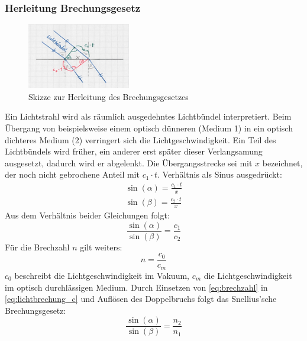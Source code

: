 \documentclass[a4paper, 11pt, ngerman, parskip=half-]{scrartcl}
\begin{document}
\subsubsection*{Herleitung Brechungsgesetz}
%
\begin{figure}[H]
    \centering
    \begin{samepage}
        \includegraphics[width=0.4\textwidth]{image/15/brechungsgesetz.jpg}
        \caption{Skizze zur Herleitung des Brechungsgesetzes}
        \label{fig:brechungsgesetz}
    \end{samepage}
\end{figure}
%
Ein Lichtstrahl wird als räumlich ausgedehntes Lichtbündel interpretiert. Beim Übergang von beispielsweise einem optisch dünneren (Medium 1) in ein optisch dichteres Medium (2) verringert sich die Lichtgeschwindigkeit. Ein Teil des Lichtbündels wird früher, ein anderer erst später dieser Verlangsamung ausgesetzt, dadurch wird er abgelenkt. Die Übergangsstrecke sei mit $x$ bezeichnet, der noch nicht gebrochene Anteil mit $c_1 \cdot t$. Verhältnis als Sinus ausgedrückt:
%
\begin{equation}
    \begin{split}
        \sin(\alpha) = \frac{c_1 \cdot t}{x} \\
        \sin(\beta) = \frac{c_2 \cdot t}{x}
    \end{split}
\end{equation}
%
Aus dem Verhältnis beider Gleichungen folgt:
\begin{equation}
    \label{eq:lichtbrechung_c}
    \frac{\sin(\alpha)}{\sin(\beta)} = \frac{c_1}{c_2}
\end{equation}
%
Für die Brechzahl $n$ gilt weiters:
\begin{equation}
    \label{eq:brechzahl}
    n = \frac{c_0}{c_m}
\end{equation}
%
$c_0$ beschreibt die Lichtgeschwindigkeit im Vakuum, $c_m$ die Lichtgeschwindigkeit im optisch durchlässigen Medium. Durch Einsetzen von \autoref{eq:brechzahl} in \autoref{eq:lichtbrechung_c} und Auflösen des Doppelbruchs folgt das Snellius'sche Brechungsgesetz:
%
\begin{equation}
    \label{eq:brechungsgesetz_n}
    \frac{\sin(\alpha)}{\sin(\beta)} = \frac{n_2}{n_1}
\end{equation}
\end{document}
